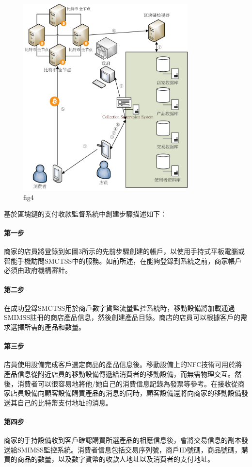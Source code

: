 	\begin{figure}[h]
		\centering
		\includegraphics[width = 0.8\textwidth]{fig4.png}
		\caption{fig4}\label{fig4}
	\end{figure}

	基於區塊鏈的支付收款監督系統中創建步驟描述如下：
		\paragraph{第一步}商家的店員將登錄到如圖3所示的先前步驟創建的帳戶，以使用手持式平板電腦或智能手機訪問SMCTSS中的服務。如前所述，在能夠登錄到系統之前，商家帳戶必須由政府機構審計。
		\paragraph{第二步}在成功登錄SMCTSS用於商戶數字貨幣流量監控系統時，移動設備將加載通過SMIMSS註冊的商店產品信息，然後創建產品目錄。商店的店員可以根據客戶的需求選擇所需的產品和數量。
		\paragraph{第三步}店員使用設備完成客戶選定商品的產品信息後。移動設備上的NFC技術可用於將產品信息從附近店員的移動設備傳遞給消費者的移動設備，而無需物理交互。然後，消費者可以很容易地將他/她自己的消費信息記錄為發票等參考。在接收從商家店員設備向顧客設備購買產品的消息的同時，顧客設備還將向商家的移動設備發送其自己的比特幣支付地址的消息。
		\paragraph{第四步}商家的手持設備收到客戶確認購買所選產品的相應信息後，會將交易信息的副本發送給SMIMSS監控系統。消費者信息包括交易序列號，商戶ID號碼，商品號碼，購買的商品的數量，以及數字貨幣的收款人地址以及消費者的支付地址。
